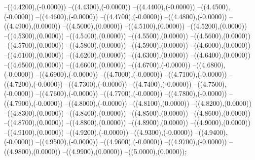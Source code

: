{	--({\sx*(4.4200)},{\sy*(-0.0000)})
	--({\sx*(4.4300)},{\sy*(-0.0000)})
	--({\sx*(4.4400)},{\sy*(-0.0000)})
	--({\sx*(4.4500)},{\sy*(-0.0000)})
	--({\sx*(4.4600)},{\sy*(-0.0000)})
	--({\sx*(4.4700)},{\sy*(-0.0000)})
	--({\sx*(4.4800)},{\sy*(-0.0000)})
	--({\sx*(4.4900)},{\sy*(0.0000)})
	--({\sx*(4.5000)},{\sy*(0.0000)})
	--({\sx*(4.5100)},{\sy*(0.0000)})
	--({\sx*(4.5200)},{\sy*(0.0000)})
	--({\sx*(4.5300)},{\sy*(0.0000)})
	--({\sx*(4.5400)},{\sy*(0.0000)})
	--({\sx*(4.5500)},{\sy*(0.0000)})
	--({\sx*(4.5600)},{\sy*(0.0000)})
	--({\sx*(4.5700)},{\sy*(0.0000)})
	--({\sx*(4.5800)},{\sy*(0.0000)})
	--({\sx*(4.5900)},{\sy*(0.0000)})
	--({\sx*(4.6000)},{\sy*(0.0000)})
	--({\sx*(4.6100)},{\sy*(0.0000)})
	--({\sx*(4.6200)},{\sy*(0.0000)})
	--({\sx*(4.6300)},{\sy*(0.0000)})
	--({\sx*(4.6400)},{\sy*(0.0000)})
	--({\sx*(4.6500)},{\sy*(0.0000)})
	--({\sx*(4.6600)},{\sy*(0.0000)})
	--({\sx*(4.6700)},{\sy*(-0.0000)})
	--({\sx*(4.6800)},{\sy*(-0.0000)})
	--({\sx*(4.6900)},{\sy*(-0.0000)})
	--({\sx*(4.7000)},{\sy*(-0.0000)})
	--({\sx*(4.7100)},{\sy*(-0.0000)})
	--({\sx*(4.7200)},{\sy*(-0.0000)})
	--({\sx*(4.7300)},{\sy*(-0.0000)})
	--({\sx*(4.7400)},{\sy*(-0.0000)})
	--({\sx*(4.7500)},{\sy*(-0.0000)})
	--({\sx*(4.7600)},{\sy*(-0.0000)})
	--({\sx*(4.7700)},{\sy*(-0.0000)})
	--({\sx*(4.7800)},{\sy*(-0.0000)})
	--({\sx*(4.7900)},{\sy*(-0.0000)})
	--({\sx*(4.8000)},{\sy*(-0.0000)})
	--({\sx*(4.8100)},{\sy*(0.0000)})
	--({\sx*(4.8200)},{\sy*(0.0000)})
	--({\sx*(4.8300)},{\sy*(0.0000)})
	--({\sx*(4.8400)},{\sy*(0.0000)})
	--({\sx*(4.8500)},{\sy*(0.0000)})
	--({\sx*(4.8600)},{\sy*(0.0000)})
	--({\sx*(4.8700)},{\sy*(0.0000)})
	--({\sx*(4.8800)},{\sy*(0.0000)})
	--({\sx*(4.8900)},{\sy*(0.0000)})
	--({\sx*(4.9000)},{\sy*(0.0000)})
	--({\sx*(4.9100)},{\sy*(0.0000)})
	--({\sx*(4.9200)},{\sy*(-0.0000)})
	--({\sx*(4.9300)},{\sy*(-0.0000)})
	--({\sx*(4.9400)},{\sy*(-0.0000)})
	--({\sx*(4.9500)},{\sy*(-0.0000)})
	--({\sx*(4.9600)},{\sy*(-0.0000)})
	--({\sx*(4.9700)},{\sy*(-0.0000)})
	--({\sx*(4.9800)},{\sy*(0.0000)})
	--({\sx*(4.9900)},{\sy*(0.0000)})
	--({\sx*(5.0000)},{\sy*(0.0000)});
}
